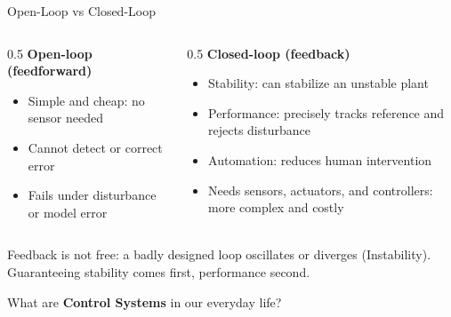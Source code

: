 \documentclass[12pt, aspectratio=169]{beamer}
\begin{document}
\begin{frame}{Open-Loop vs Closed-Loop}
    \begin{columns}[t]
        \begin{column}{0.5\textwidth}
            \textbf{Open-loop (feedforward)}
            \begin{itemize}
                \item[\textcolor{brandred}{$+$}] Simple and cheap: no sensor needed
                \item[\textcolor{brandred}{$-$}] Cannot detect or correct error
                \item[\textcolor{brandred}{$-$}] Fails under disturbance or model error
            \end{itemize}
        \end{column}
        \pause
        \begin{column}{0.5\textwidth}
            \textbf{Closed-loop (feedback)}
                \begin{itemize}
                    \item[\textcolor{brandred}{$+$}] Stability: can stabilize an unstable plant
                    \item[\textcolor{brandred}{$+$}] Performance: precisely tracks reference and rejects disturbance
                    \item[\textcolor{brandred}{$+$}] Automation: reduces human intervention
                    \item[\textcolor{brandred}{$-$}] Needs sensors, actuators, and controllers: more complex and costly
                \end{itemize}
        \end{column}
    \end{columns}
    \vspace{1em}
    \pause
    \begin{center}
        \alert{Feedback is not free}: a badly designed loop oscillates or diverges (\alert{Instability}).\\
        Guaranteeing \alert{stability} comes first, performance second.
    \end{center}
\end{frame}

\begin{frame}
    \begin{center}
        \Large What are \textbf{Control Systems} in our everyday life?
    \end{center}
\end{frame}
\end{document}
